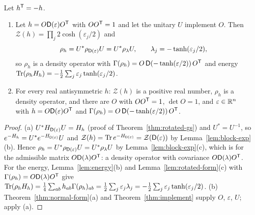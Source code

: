 \begin{theorem}\label{thm:thermal}
Let $h^{\mathsf T}=-h$.
\begin{enumerate}
\item[(a)] Let $h=O\mathsf D(\varepsilon)O^{\mathsf T}$ with $OO^{\mathsf T}=1$ and let the unitary $U$ implement
$O$. Then $\mathcal Z(h)=\prod_j2\cosh(\varepsilon_j/2)$ and
\[
 \rho_h=U^*\rho_{\mathsf D(\varepsilon)}U=U^*\rho_\lambda U,\qquad \lambda_j=-\tanh(\varepsilon_j/2),
\]
so $\rho_h$ is a density operator with
$\Gamma(\rho_h)=O\,\mathsf D(-\tanh(\varepsilon/2))\,O^{\mathsf T}$ and energy
$\operatorname{Tr}(\rho_hH_h)=-\tfrac12\sum_j\varepsilon_j\tanh(\varepsilon_j/2)$.
\item[(b)] For every real antisymmetric $h$: $\mathcal Z(h)$ is a positive real number, $\rho_h$ is a
density operator, and there are $O$ with $OO^{\mathsf T}=1$, $\det O=1$, and $\varepsilon\in\mathbb R^n$ with
$h=O\mathsf D(\varepsilon)O^{\mathsf T}$ and $\Gamma(\rho_h)=O\,\mathsf D(-\tanh(\varepsilon/2))\,O^{\mathsf T}$.
\end{enumerate}
\end{theorem}
\begin{proof}
(a) $U^*H_{\mathsf D(\varepsilon)}U=H_h$ (proof of Theorem~\ref{thm:rotated-gs}) and $U^*=U^{-1}$, so
$e^{-H_h}=U^*e^{-H_{\mathsf D(\varepsilon)}}U$ and $\mathcal Z(h)=\operatorname{Tr} e^{-H_{\mathsf D(\varepsilon)}}=\mathcal Z(\mathsf D(\varepsilon))$ by
Lemma~\ref{lem:block-exp}(b). Hence $\rho_h=U^*\rho_{\mathsf D(\varepsilon)}U=U^*\rho_\lambda U$ by
Lemma~\ref{lem:block-exp}(c), which is  for the
admissible matrix $O\mathsf D(\lambda)O^{\mathsf T}$: a density operator with covariance $O\mathsf D(\lambda)O^{\mathsf T}$.
For the energy, Lemma~\ref{lem:energy}(b) and Lemma~\ref{lem:rotated-form}(c) with
$\Gamma(\rho_h)=O\mathsf D(\lambda)O^{\mathsf T}$ give
$\operatorname{Tr}(\rho_hH_h)=\tfrac14\sum_{ab}h_{ab}\Gamma(\rho_h)_{ab}
=\tfrac12\sum_j\varepsilon_j\lambda_j=-\tfrac12\sum_j\varepsilon_j\tanh(\varepsilon_j/2)$.
(b) Theorem~\ref{thm:normal-form}(a) and Theorem~\ref{thm:implement} supply $O$, $\varepsilon$,
$U$; apply (a).
\end{proof}

